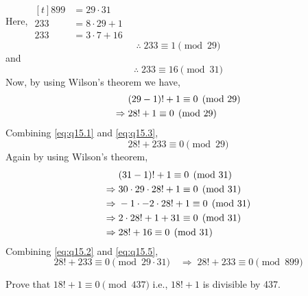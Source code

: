 \documentclass[12pt,class=book,crop=false]{standalone}
\begin{document}
\begin{soln}
    Here, $ \begin{aligned}[t]
        899&=29\cdot31\\
        233&=8\cdot29+1\\
        233&=3\cdot7+16
    \end{aligned} $
    \begin{equation}
        \therefore \;233\equiv1\pmod{29}\label{eq:q15.1}
    \end{equation}
    and
    \begin{equation}
        \therefore \;233\equiv16\pmod{31}\label{eq:q15.2}
    \end{equation}
    Now, by using Wilson's theorem we have,
    \begin{align}
        & (29-1)!+1\equiv 0\pmod{29}\notag\\
        \Rightarrow\;& 28!+1\equiv 0\pmod{29}\label{eq:q15.3}
    \end{align}
    Combining \eqref{eq:q15.1} and \eqref{eq:q15.3},
    \begin{equation}
        28!+233\equiv0\pmod{29}\label{eq:q15.4}
    \end{equation} 
    Again by using Wilson's theorem,
    \begin{align}
        & (31-1)!+1\equiv 0\pmod{31}\notag\\
        \Rightarrow\;& 30\cdot 29\cdot 28!+1\equiv 0\pmod{31}\notag\\
        \Rightarrow\;& -1\cdot -2\cdot 28!+1\equiv 0\pmod{31}\notag\\
        \Rightarrow\;& 2\cdot 28!+1+31\equiv 0\pmod{31}\notag\\
        \Rightarrow\;& 28!+16\equiv 0\pmod{31}\label{eq:q15.5}
    \end{align}
    Combining \eqref{eq:q15.2} and \eqref{eq:q15.5},
    \[
        28!+233\equiv 0\pmod{29\cdot31} \quad \Rightarrow\; 28!+233\equiv 0\pmod{899}
    \]
\end{soln}
\begin{qn}
    Prove that $ 18!+1 \equiv 0\pmod{437} $ i.e., $ 18!+1 $ is divisible by 437.
\end{qn}
\end{document}

